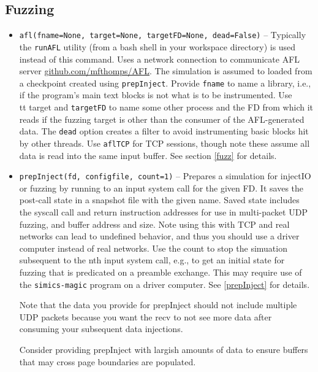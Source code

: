 \documentclass[titlepage]{article}
\begin{document}
\subsection{Fuzzing}
\begin{itemize}

\item{\tt afl(fname=None, target=None, targetFD=None, dead=False)} -- Typically the {\tt runAFL} utility (from a bash shell in your workspace directory) is used instead of this command.  Uses a network connection to communicate AFL server \url{github.com/mfthomps/AFL}.  
The simulation is assumed to loaded from a checkpoint created using {\tt prepInject}.  Provide {\tt fname} to name a library, i.e., if the program's main
text blocks is not what is to be instrumented.
Use {\\tt target} and {\tt targetFD} to name some other process 
and the FD from which it reads if the fuzzing target is other
than the consumer of the AFL-generated data.  The {\tt dead} option creates a filter to avoid instrumenting basic blocks hit by other threads.
Use {\tt aflTCP} for TCP sessions, though note these assume all data is read into
the same input buffer.  
See section \ref{fuzz} for details.

\item{\tt prepInject(fd, configfile, count=1)} -- Prepares a simulation for injectIO or fuzzing by running to an input system call for the given FD.  It saves the post-call state in a snapshot
file with the given name.  Saved state includes the syscall call and return instruction addresses for use in multi-packet UDP fuzzing, and buffer address and size.
Note using this with TCP and real networks can lead to undefined behavior, and thus you should use a driver computer instead of real networks.  
Use the count to stop the simuation subsequent to the nth input system call, e.g., to get an initial state for fuzzing that is predicated on a preamble exchange.
This may require use of the {\tt simics-magic} program on a driver computer.  See \ref{prepInject} for details.

Note that the data you provide for prepInject should not include multiple UDP packets because you want the recv to not see more data after consuming your
subsequent data injections.

Consider providing prepInject with largish amounts of data to ensure buffers that may cross page boundaries are populated.


\end{itemize}
\end{document}
